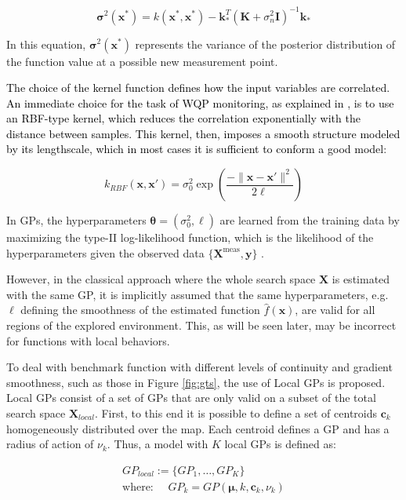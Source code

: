 \documentclass[journal]{IEEEtran}
\newcommand\changes[1]{\textcolor{black}{#1}}
\newcommand\vect[1]{\boldsymbol{#1}}
\begin{document}
\begin{equation}
\vect{\sigma}^2(\vect{x}^*) = k\left(\vect{x}^*, \vect{x}^*\right)-\mathbf{k}_*^T\left(\mathbf{K}+\sigma_n^2 \mathbf{I}\right)^{-1} \mathbf{k}_*
\end{equation}

In this equation, $\vect{\sigma}^2(\vect{x}^*)$ represents the variance of the posterior distribution of the function value at a possible new  measurement point. 

\changes{The choice of the kernel function defines how the input variables are correlated. An immediate choice for the task of WQP monitoring, as explained in \cite{peralta_MULTIOBJECTIVE}, is to use an RBF-type kernel, which reduces the correlation exponentially with the distance between samples. This kernel, then, imposes a smooth structure modeled by its lengthscale, which in most cases it is sufficient to conform a good model}:

\begin{equation}
    k_{RBF}(\vect{x},\vect{x}') = \sigma_0^2 \exp\left({\frac{-\|\vect{x}-\vect{x}'\|^2}{2\ell}}\right)
\end{equation}

In GPs, the hyperparameters $\vect{\theta} = (\sigma_0^2, \ell)$ are learned from the training data by maximizing the type-II log-likelihood function, which is the likelihood of the hyperparameters given the observed data $\{\vect{X}^{\mathrm{meas}},\vect{y}\}$ \cite{RasmussenBible}. 


However, in the classical approach where the whole search space $\vect{X}$ is estimated with the same GP, it is implicitly assumed that the same hyperparameters, e.g. $\ell$ defining the smoothness of the estimated function $\hat f(\vect{x})$, are valid for all regions of the explored environment. 
This, as will be seen later, may be incorrect for functions with local behaviors.

To deal with benchmark function with different levels of continuity and gradient smoothness, such as those in Figure \ref{fig:gts}, the use of Local GPs is proposed. Local GPs consist of a set of GPs that are only valid on a subset of the total search space $\vect{X}_{local}$. 
First, to this end it is possible to define a set of centroids $\vect{c}_k$ homogeneously distributed over the map. 
Each centroid defines a GP and has a radius of action of $\nu_k$. 
Thus, a model with $K$ local GPs is defined as:

\begin{equation}
\begin{aligned}
    GP_{local} := \{ GP_1, \ldots, GP_K\} \\
    \text{where: } \quad GP_k = GP(\vect{\mu}, k, \vect{c}_k, \nu_k)
\end{aligned}
\end{equation}
\end{document}
